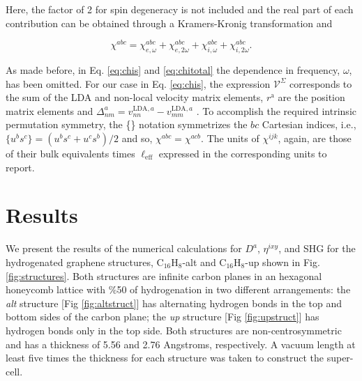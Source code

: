 \documentclass[aps,pra,11pt,tightenlines,showpacs,superscriptaddress,groupedaddress]{revtex4-1}
\newcommand{\da}{$D^{a}$}
\newcommand{\ea}{$\eta^{ixy}$}
\newcommand{\altstc}{C$_{16}$H$_{8}$-alt}
\newcommand{\upstc}{C$_{16}$H$_{8}$-up}
\begin{document}
\noindent Here, the factor of 2 for spin degeneracy is not included and the real part of each contribution can be obtained through a Kramers-Kronig transformation \cite{tancogne2014effect} and 

\begin{equation}\label{eq:chitotal}
    \chi^{abc} = \chi^{abc}_{e,\omega} + \chi^{abc}_{e,2\omega} + \chi^{abc}_{i,\omega} + \chi^{abc}_{i,2\omega}
    .
\end{equation}

As made before, in Eq. \ref{eq:chis} and \ref{eq:chitotal} the dependence in frequency, $\omega$, has been omitted. For our case in Eq. \ref{eq:chis}, the  expression $\mathcal{V}^{\Sigma}$ corresponds to the sum of the LDA and non-local velocity matrix elements, $r^{\mathrm{a}} $ are the position matrix elements and $\Delta^{a}_{nm} = v^{\text{LDA},a}_{nn} - v^{\text{LDA},a}_{mm} $ \cite{anderson2015theory}. To accomplish the required intrinsic permutation symmetry, the \{\} notation symmetrizes the $bc$ Cartesian indices, i.e., $\{u^{b}s^{c}\} = (u^{b}s^{c} + u^{c}s^{b})/{2}$ and so, $\chi^{abc} = \chi^{acb}$. The units of $\chi^{ijk} $, again, are those of their bulk equivalents times $\ell_{\text{eff}}$ expressed in the corresponding units to report.







\section{Results} %
\label{sec:results}


We present the results of the numerical calculations for \da, \ea, and SHG for the hydrogenated graphene structures, {\altstc} and {\upstc} shown in Fig. \ref{fig:structures}. Both structures are infinite carbon planes in an hexagonal honeycomb lattice with \%50 of hydrogenation in two different arrangements: the \emph{alt} structure [Fig \ref{fig:altstruct}] has alternating hydrogen bonds in the top and bottom sides of the carbon plane; the \emph{up} structure [Fig \ref{fig:upstruct}] has hydrogen bonds only in the top side. Both structures are non-centrosymmetric and has a thickness of 5.56 and 2.76 Angstroms, respectively. A vacuum length at least  five times the thickness for each structure was taken to construct the super-cell.  
\end{document}
